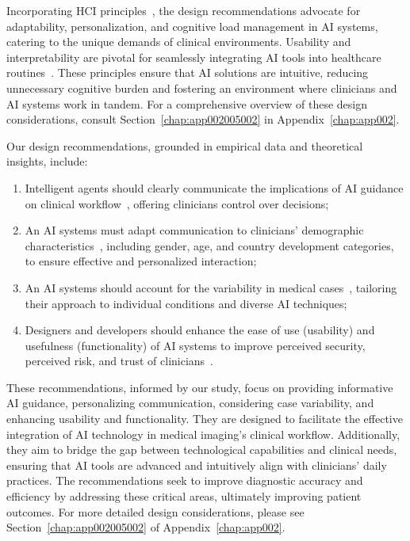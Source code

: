 \textcolor{revised}{Incorporating \ac{HCI} principles~\cite{Knisely2021}, the design recommendations advocate for adaptability, personalization, and cognitive load management in \ac{AI} systems, catering to the unique demands of clinical environments.
Usability and interpretability are pivotal for seamlessly integrating \ac{AI} tools into healthcare routines~\cite{10.1145/3411764.3445385}.
These principles ensure that \ac{AI} solutions are intuitive, reducing unnecessary cognitive burden and fostering an environment where clinicians and \ac{AI} systems work in tandem.
For a comprehensive overview of these design considerations, consult Section~\ref{chap:app002005002} in Appendix~\ref{chap:app002}.}

\vspace{1.50mm}

\noindent
\textcolor{revised}{Our design recommendations, grounded in empirical data and theoretical insights, include:}

\vspace{0.50mm}

\begin{enumerate}
\item \textcolor{revised}{Intelligent agents should clearly communicate the implications of \ac{AI} guidance on clinical workflow~\cite{MALAMATENIOU20211192}, offering clinicians control over decisions;}
\item \textcolor{revised}{An \ac{AI} systems must adapt communication to clinicians' demographic characteristics~\cite{Alowais2023}, including gender, age, and country development categories, to ensure effective and personalized interaction;}
\item \textcolor{revised}{An \ac{AI} systems should account for the variability in medical cases~\cite{10.1145/3313831.3376506}, tailoring their approach to individual conditions and diverse \ac{AI} techniques;}
\item \textcolor{revised}{Designers and developers should enhance the ease of use (usability) and usefulness (functionality) of \ac{AI} systems to improve perceived security, perceived risk, and trust of clinicians~\cite{OPRESCU202253}.}
\end{enumerate}

\textcolor{revised}{These recommendations, informed by our study, focus on providing informative \ac{AI} guidance, personalizing communication, considering case variability, and enhancing usability and functionality.
They are designed to facilitate the effective integration of \ac{AI} technology in medical imaging's clinical workflow.
Additionally, they aim to bridge the gap between technological capabilities and clinical needs, ensuring that \ac{AI} tools are advanced and intuitively align with clinicians' daily practices.
The recommendations seek to improve diagnostic accuracy and efficiency by addressing these critical areas, ultimately improving patient outcomes.
For more detailed design considerations, please see Section~\ref{chap:app002005002} of Appendix~\ref{chap:app002}.}

